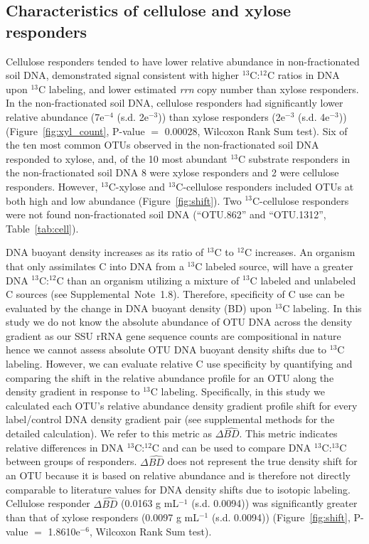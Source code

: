 \subsection{Characteristics of cellulose and xylose responders}
Cellulose responders tended to have lower relative abundance in
non-fractionated soil DNA, demonstrated signal consistent with higher
$^{13}$C:$^{12}$C ratios in DNA upon $^{13}$C labeling, and lower estimated
\textit{rrn} copy number than xylose responders. In the non-fractionated soil
DNA, cellulose responders had significantly lower relative abundance (7e$^{-4}$
(s.d. 2e$^{-3}$)) than xylose responders (2e$^{-3}$ (s.d. 4e$^{-3}$))
(Figure~\ref{fig:xyl_count}, P-value $=$ 0.00028, Wilcoxon Rank Sum test). Six
of the ten most common OTUs observed in the non-fractionated soil DNA responded
to xylose, and, of the 10 most abundant $^{13}$C substrate responders in the
non-fractionated soil DNA 8 were xylose responders and 2 were cellulose
responders. However, $^{13}$C-xylose and $^{13}$C-cellulose responders included
OTUs at both high and low abundance (Figure~\ref{fig:shift}). Two
$^{13}$C-cellulose responders were not found non-fractionated soil DNA
(``OTU.862'' and ``OTU.1312'', Table~\ref{tab:cell}).

DNA buoyant density increases as its ratio of $^{13}$C to $^{12}$C increases.
An organism that only assimilates C into DNA from a $^{13}$C labeled source,
will have a greater DNA $^{13}$C:$^{12}$C than an organism utilizing a mixture
of $^{13}$C labeled and unlabeled C sources (see Supplemental~Note~1.8).
Therefore, specificity of C use can be evaluated by the change in DNA
buoyant density (BD) upon $^{13}$C labeling. In this study we do not know the
absolute abundance of OTU DNA across the density gradient as our SSU rRNA gene
sequence counts are compositional in nature hence we cannot assess absolute OTU
DNA buoyant density shifts due to $^{13}$C labeling. However, we can evaluate
relative C use specificity by quantifying and comparing the shift in the
relative abundance profile for an OTU along the density gradient in response to
$^{13}$C labeling. Specifically, in this study we calculated each OTU's
relative abundance density gradient profile shift for every
label/control DNA density gradient pair (see supplemental methods for the
detailed calculation). We refer to this metric as $\Delta\hat{BD}$. This metric
indicates relative differences in DNA $^{13}$C:$^{12}$C and can be used to
compare DNA $^{13}$C:$^{13}$C between groups of responders. $\Delta\hat{BD}$
does not represent the true density shift for an OTU because it is based on
relative abundance and is therefore not directly comparable to literature
values for DNA density shifts due to isotopic labeling. Cellulose responder
$\Delta\hat{BD}$ (0.0163 g mL$^{-1}$ (s.d. 0.0094)) was significantly greater
than that of xylose responders (0.0097 g mL$^{-1}$ (s.d. 0.0094))
(Figure~\ref{fig:shift}, P-value $=$ 1.8610e$^{-6}$, Wilcoxon Rank Sum test). 

